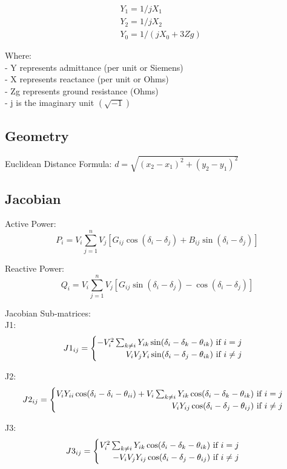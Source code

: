 \documentclass{article}
\begin{document}
	\begin{align*}
		& Y_1 = 1/jX_1 \\
		& Y_2 = 1/jX_2 \\
		& Y_0 = 1/(jX_0 + 3Zg)
	\end{align*}
	
	\noindent
	Where: \\
	- Y represents admittance (per unit or Siemens) \\
	- X represents reactance (per unit or Ohms) \\
	- Zg represents ground resistance (Ohms) \\
	- j is the imaginary unit $(\sqrt{-1})$ 
	
	\subsection*{Geometry}
	Euclidean Distance Formula: $d = \sqrt{(x_2 - x_1)^2 + (y_2 - y_1)^2}$ \\
	
	\subsection*{Jacobian}
	Active Power: 
	\[
	P_i = V_i \sum_{j=1}^{n} V_j[G_{ij} \cos(\delta_i - \delta_j) + B_{ij} \sin(\delta_i - \delta_j)]
	\]
	
	\noindent
	Reactive Power: 
	\[
	Q_i = V_i \sum_{j=1}^{n} V_j[G_{ij} \sin(\delta_i - \delta_j) - \cos(\delta_i - \delta_j)]
	\]
	
	\noindent
	Jacobian Sub-matrices: \\
	
	\noindent
	J1: 
	\[
		J1_{ij} = 
		\begin{cases}
			\hfill -V_i^2 \sum_{k \neq i} Y_{ik} \sin (\delta_i - \delta_k - \theta_{ik}) \text{ if } i = j  \\
			\hfill V_i V_j Y_i \sin(\delta_i - \delta_j - \theta_{ik}) \text{ if } i \neq j
		\end{cases}
	\]
	
	\noindent
	J2:
	\[
		J2_{ij} = 
		\begin{cases}
			\hfill V_i Y_{ii} \cos(\delta_i - \delta_i - \theta_{ii}) + V_i \sum_{k \neq i} Y_{ik} \cos(\delta_i - \delta_k - \theta_{ik}) \text{ if } i = j \\
			\hfill V_i Y_{ij} \cos(\delta_i - \delta_j - \theta_{ij}) \text{ if } i \neq j
		\end{cases}
	\]
	
	\noindent
	J3: 
	\[
		J3_{ij} = 
		\begin{cases}
			\hfill V_i^2 \sum_{k \neq i} Y_{ik} \cos(\delta_i - \delta_k - \theta_{ik}) \text{ if } i = j \\
			\hfill -V_i V_j Y_{ij} \cos(\delta_i - \delta_j - \theta_{ij}) \text{ if } i \neq j
		\end{cases}
	\]
	
\end{document}
